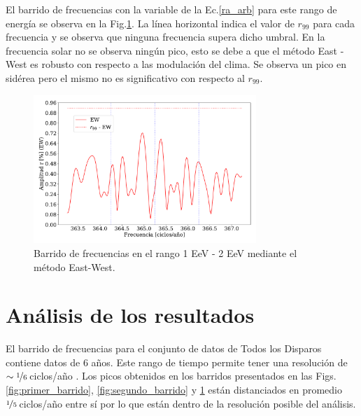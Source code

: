     El barrido de frecuencias con la variable de la Ec.\ref{ra_arb} para este rango de energía se observa en la Fig.\ref{fig:tercer_barrido}. La línea horizontal indica el valor de $r_{99}$ para cada frecuencia y se observa que ninguna frecuencia supera dicho umbral. En la frecuencia solar no se observa ningún pico, esto se debe a que el método East - West es robusto con respecto a las modulación del clima. Se observa un pico en sidérea pero el mismo no es significativo con respecto al $r_{99}$.


    \begin{figure}[H]
        \begin{small}
            \begin{center}
                \includegraphics[width=0.75\textwidth]{plot_bin_3_barrido_v3_EW.pdf}
            \end{center}
            \caption{Barrido de frecuencias en el rango 1 EeV - 2 EeV mediante el método East-West.}
            \label{fig:tercer_barrido}
        \end{small}
    \end{figure}    

    \section{Análisis de los resultados}

    El barrido de frecuencias para el conjunto de datos de Todos los Disparos contiene datos de 6 años. Este rango de tiempo  permite tener una resolución de $\sim\nicefrac{1}{6}  \,$ciclos/año \cite{resolucion_barrido}. Los picos obtenidos en los barridos presentados en las Figs.\ref{fig:primer_barrido}, \ref{fig:segundo_barrido} y \ref{fig:tercer_barrido} están distanciados en promedio $\nicefrac{1}{5}\,$ciclos/año entre sí por lo que están dentro de la resolución posible del análisis. 

